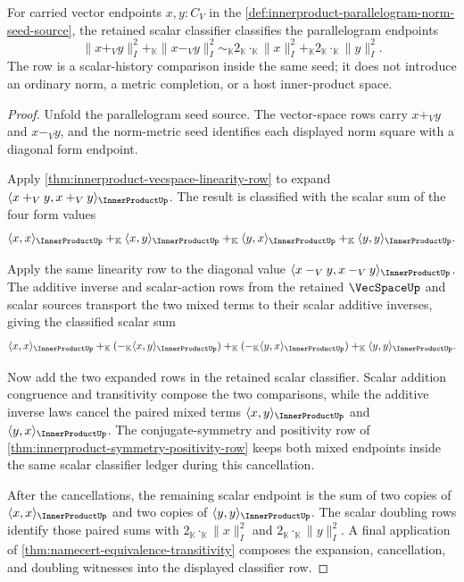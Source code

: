 \begin{theorem}
\label{thm:innerproduct-parallelogram-identity-row}
For carried vector endpoints $x,y:C_V$ in the
\autoref{def:innerproduct-parallelogram-norm-seed-source}, the retained scalar
classifier classifies the parallelogram endpoints
$$
\|x+_V y\|_{I}^{2}+_{\mathbb{K}}\|x-_V y\|_{I}^{2}
\sim_{\mathbb{K}}
2_{\mathbb{K}}\cdot_{\mathbb{K}}\|x\|_{I}^{2}
+_{\mathbb{K}}
2_{\mathbb{K}}\cdot_{\mathbb{K}}\|y\|_{I}^{2}.
$$
The row is a scalar-history comparison inside the same seed; it does not
introduce an ordinary norm, a metric completion, or a host inner-product
space.
\end{theorem}
\begin{proof}
Unfold the parallelogram seed source. The vector-space rows carry
$x+_V y$ and $x-_V y$, and the norm-metric seed identifies each displayed
norm square with a diagonal form endpoint.

Apply \autoref{thm:innerproduct-vecspace-linearity-row} to expand
$\langle x+_V y,x+_V y\rangle_{\InnerProductUp}$. The result is classified
with the scalar sum of the four form values
$$
\langle x,x\rangle_{\InnerProductUp}
+_{\mathbb{K}}
\langle x,y\rangle_{\InnerProductUp}
+_{\mathbb{K}}
\langle y,x\rangle_{\InnerProductUp}
+_{\mathbb{K}}
\langle y,y\rangle_{\InnerProductUp}.
$$

Apply the same linearity row to the diagonal value
$\langle x-_V y,x-_V y\rangle_{\InnerProductUp}$. The additive inverse and
scalar-action rows from the retained $\VecSpaceUp$ and scalar sources
transport the two mixed terms to their scalar additive inverses, giving the
classified scalar sum
$$
\langle x,x\rangle_{\InnerProductUp}
+_{\mathbb{K}}
(-_{\mathbb{K}}\langle x,y\rangle_{\InnerProductUp})
+_{\mathbb{K}}
(-_{\mathbb{K}}\langle y,x\rangle_{\InnerProductUp})
+_{\mathbb{K}}
\langle y,y\rangle_{\InnerProductUp}.
$$

Now add the two expanded rows in the retained scalar classifier. Scalar
addition congruence and transitivity compose the two comparisons, while the
additive inverse laws cancel the paired mixed terms
$\langle x,y\rangle_{\InnerProductUp}$ and
$\langle y,x\rangle_{\InnerProductUp}$. The conjugate-symmetry and positivity
row of \autoref{thm:innerproduct-symmetry-positivity-row} keeps both mixed
endpoints inside the same scalar classifier ledger during this cancellation.

After the cancellations, the remaining scalar endpoint is the sum of two
copies of $\langle x,x\rangle_{\InnerProductUp}$ and two copies of
$\langle y,y\rangle_{\InnerProductUp}$. The scalar doubling rows identify
those paired sums with
$2_{\mathbb{K}}\cdot_{\mathbb{K}}\|x\|_{I}^{2}$ and
$2_{\mathbb{K}}\cdot_{\mathbb{K}}\|y\|_{I}^{2}$. A final application of
\autoref{thm:namecert-equivalence-transitivity} composes the expansion,
cancellation, and doubling witnesses into the displayed classifier row.
\end{proof}

